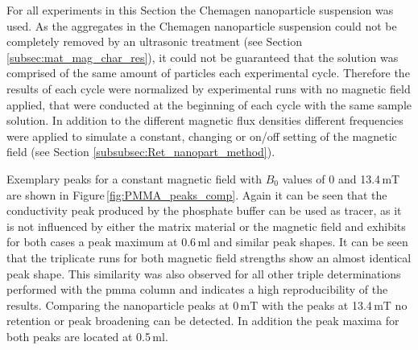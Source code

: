 For all experiments in this Section the Chemagen nanoparticle suspension was used. 
As the aggregates in the Chemagen nanoparticle suspension could not be completely removed by an ultrasonic treatment (see Section \ref{subsec:mat_mag_char_res}), it could not be guaranteed that the solution was comprised of the same amount of particles each experimental cycle. Therefore the results of each cycle were normalized by experimental runs with no magnetic field applied, that were conducted at the beginning of each cycle with the same sample solution. In addition to the different magnetic flux densities different frequencies were applied to simulate a constant, changing or on/off setting of the magnetic field (see Section \ref{subsubsec:Ret_nanopart_method}). 
  
Exemplary peaks for a constant magnetic field with $B_{0}$ values of 0 and 13.4\,mT are shown in Figure\,\ref{fig:PMMA_peaks_comp}. Again it can be seen that the conductivity peak produced by the phosphate buffer can be used as tracer, as it is not influenced by either the matrix material or the magnetic field and exhibits for both cases a peak maximum at 0.6\,ml and similar peak shapes. It can be seen that the triplicate runs for both magnetic field strengths show an almost identical peak shape. This similarity was also observed for all other triple determinations performed with the \gls{pmma} column and indicates a high reproducibility of the results. Comparing the nanoparticle peaks at 0\,mT with the peaks at 13.4\,mT no retention or peak broadening can be detected. In addition the peak maxima for both peaks are located at 0.5\,ml. 

